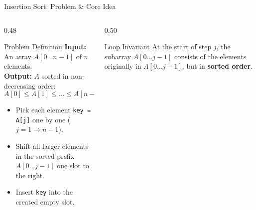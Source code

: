\documentclass[aspectratio=169]{beamer}
\begin{document}
\begin{frame}{Insertion Sort: Problem \& Core Idea}
  \begin{columns}[T]
    \begin{column}{0.48\textwidth}
      \begin{block}{Problem Definition}
        \scriptsize
        \textbf{Input:} An array $A[0 \dots n-1]$ of $n$ elements.\\
        \textbf{Output:} $A$ sorted in non-decreasing order:
        \[
          A[0] \le A[1] \le \dots \le A[n-1].
        \]
      \end{block}
      \begin{tcolorbox}[colframe=ForestGreen,colback=SoftGreen!30,title={\centering\bfseries Core Idea (Card Player Analogy)},arc=1.5mm]
        \scriptsize
        \begin{itemize}\setlength{\itemsep}{0.15em}
          \item Pick each element \texttt{key = A[j]} one by one ($j = 1 \to n-1$).
          \item Shift all larger elements in the sorted prefix $A[0 \dots j-1]$ one slot to the right.
          \item Insert \texttt{key} into the created empty slot.
        \end{itemize}
      \end{tcolorbox}
    \end{column}
    \begin{column}{0.50\textwidth}
      \begin{center}
      \end{center}
      \begin{exampleblock}{Loop Invariant}
        \scriptsize
        At the start of step $j$, the subarray $A[0 \dots j-1]$ consists of the elements originally in $A[0 \dots j-1]$, but in \textbf{sorted order}.
      \end{exampleblock}
    \end{column}
  \end{columns}
\end{frame}
\end{document}
